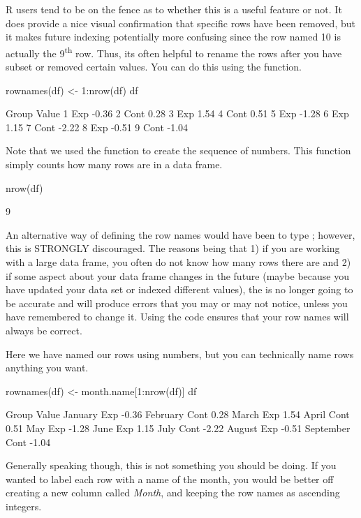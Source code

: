 R users tend to be on the fence as to whether this is a useful feature or not.  It does provide a nice visual confirmation that specific rows have been removed, but it makes future indexing potentially more confusing since the row named 10 is actually the 9\textsuperscript{th} row.  Thus, its often helpful to rename the rows after you have subset or removed certain values. You can do this using the  function.

\begin{inR}
rownames(df) <- 1:nrow(df)
df
\end{inR}
\begin{outR}
  Group Value
1   Exp -0.36
2  Cont  0.28
3   Exp  1.54
4  Cont  0.51
5   Exp -1.28
6   Exp  1.15
7  Cont -2.22
8   Exp -0.51
9  Cont -1.04
\end{outR}

Note that we used the function  to create the sequence of numbers. This function simply counts how many rows are in a data frame.

\begin{inR}
nrow(df)
\end{inR}
\begin{outR}
[1] 9
\end{outR}

An alternative way of defining the row names would have been to type ; however, this is STRONGLY discouraged.  The reasons being that 1) if you are working with a large data frame, you often do not know how many rows there are and 2) if some aspect about your data frame changes in the future (maybe because you have updated your data set or indexed different values), the  is no longer going to be accurate and will produce errors that you may or may not notice, unless you have remembered to change it. Using the code  ensures that your row names will always be correct.

Here we have named our rows using numbers, but you can technically name rows anything you want.
\begin{inR}
rownames(df) <- month.name[1:nrow(df)]
df
\end{inR}
\begin{outR}
          Group Value
January     Exp -0.36
February   Cont  0.28
March       Exp  1.54
April      Cont  0.51
May         Exp -1.28
June        Exp  1.15
July       Cont -2.22
August      Exp -0.51
September  Cont -1.04
\end{outR}

Generally speaking though, this is not something you should be doing.  If you wanted to label each row with a name of the month, you would be better off creating a new column called \textit{Month}, and keeping the row names as ascending integers.

